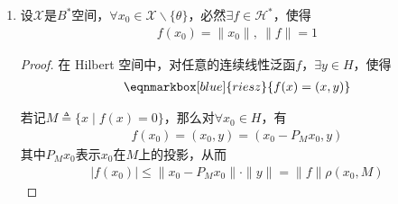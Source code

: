 \begin{enumerate}[leftmargin=2cm, label=\arabic*]
\begin{enumerate}[leftmargin=1cm, label=(\arabic*)]
\begin{proof}
				由\textbf{Hahn-Banach}定理，存在$\mathscr{X}$上的连续线性泛函$f$，使得
				\begin{align*}
					f(x_0) = f_0(x_0) = \|x_0\|,\ \|f\| = \|f_0\|_0 = 1
				\end{align*}
				$\mathscr{X}$上的这个非零连续线性泛函$f$，可以分辨$x_1,x_2$。即
				\begin{align*}
					f(x_1) - f(x_2) = f(x_1-x_2) = f(x_0) \neq 0
				\end{align*}
				故而显然有足够多的连续线性泛函。
			\end{proof}
			\item 设$\mathscr{X}$是$B^*$空间，$\forall x_0\in\mathscr{X}\backslash\{\theta\}$，必然$\exists f\in\mathscr{H}^*$，使得
			\begin{align*}
				f(x_0) = \|x_0\|,\  \|f\| = 1
			\end{align*}
			\begin{proof}
				在 Hilbert 空间中，对任意的连续线性泛函$f$，$\exists y\in H$，使得
				\begin{align*}
					\eqnmarkbox[blue]{riesz}{f(x) = (x, y)}
				\end{align*}
				
				若记$M\triangleq \{x\mid f(x) = 0\}$，那么对$\forall x_0\in H$，有
				\begin{align*}
					f(x_0) = (x_0, y) = (x_0 - P_Mx_0, y)
				\end{align*}
				其中$P_Mx_0$表示$x_0$在$M$上的投影，从而
				\begin{align*}
					|f(x_0)| \leqslant \|x_0 - P_Mx_0\| \cdot \|y\| = \|f\|\rho(x_0, M)
				\end{align*}
				

\end{proof}
\end{enumerate}
\end{enumerate}
